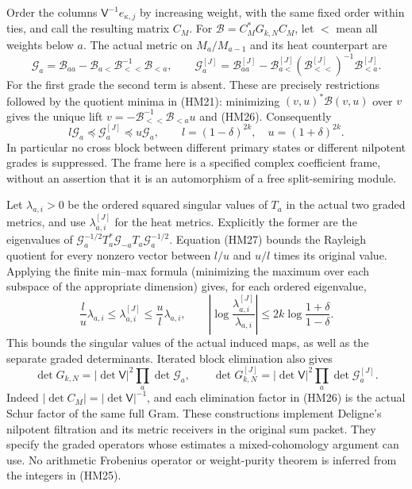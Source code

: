 \documentclass[11pt]{article}
\begin{document}
Order the columns $\mathsf V^{-1}e_{\kappa,j}$ by increasing weight,
with the same fixed order within ties, and call the resulting matrix $C_M$.
For $\mathcal B=C_M^*G_{k,N}C_M$, let $<$ mean all weights below $a$.
The actual metric on $M_a/M_{a-1}$ and its heat counterpart are
\begin{equation}\tag{HM26}
 \mathcal G_a=\mathcal B_{aa}
       -\mathcal B_{a<}\mathcal B_{<<}^{-1}\mathcal B_{<a},\qquad
 \mathcal G_a^{[J]}=\mathcal B_{aa}^{[J]}
       -\mathcal B_{a<}^{[J]}(\mathcal B_{<<}^{[J]})^{-1}
                                      \mathcal B_{<a}^{[J]}.
\end{equation}
For the first grade the second term is absent. These are precisely
restrictions followed by the quotient minima in (HM21): minimizing
$(v,u)^*\mathcal B(v,u)$ over $v$ gives the unique lift
$v=-\mathcal B_{<<}^{-1}\mathcal B_{<a}u$ and (HM26). Consequently
\begin{equation}\tag{HM27}
 l\mathcal G_a\preceq\mathcal G_a^{[J]}\preceq u\mathcal G_a,
 \qquad l=(1-\delta)^{2k},\quad u=(1+\delta)^{2k}.
\end{equation}
In particular no cross block between different primary states or
different nilpotent grades is suppressed. The frame here is a specified
complex coefficient frame, without an assertion that it is an
automorphism of a free split-semiring module.

Let $\lambda_{a,i}>0$ be the ordered squared singular values of $T_a$
in the actual two graded metrics, and use $\lambda_{a,i}^{[J]}$ for
the heat metrics. Explicitly the former are the eigenvalues of
$\mathcal G_a^{-1/2}T_a^*\mathcal G_{-a}T_a\mathcal G_a^{-1/2}$.
Equation (HM27) bounds the Rayleigh quotient for every nonzero vector
between $l/u$ and $u/l$ times its original value. Applying the finite
min--max formula (minimizing the maximum over each subspace of the
appropriate dimension) gives, for each ordered eigenvalue,
\begin{equation}\tag{HM28}
 \frac lu\lambda_{a,i}\le\lambda_{a,i}^{[J]}
        \le\frac ul\lambda_{a,i},\qquad
 \left|\log\frac{\lambda_{a,i}^{[J]}}{\lambda_{a,i}}\right|
 \le2k\log\frac{1+\delta}{1-\delta}.
\end{equation}
This bounds the singular values of the actual induced maps, as well as
the separate graded determinants. Iterated block elimination also gives
\begin{equation}\tag{HM29}
 \det G_{k,N}=|\det\mathsf V|^2\prod_a\det\mathcal G_a,
 \qquad
 \det G_{k,N}^{[J]}=|\det\mathsf V|^2\prod_a\det\mathcal G_a^{[J]}.
\end{equation}
Indeed $|\det C_M|=|\det\mathsf V|^{-1}$, and each elimination factor
in (HM26) is the actual Schur factor of the same full Gram.
These constructions implement Deligne's nilpotent filtration and its
metric receivers in the original sum packet. They specify the graded
operators whose estimates a mixed-cohomology argument can use. No
arithmetic Frobenius operator or weight-purity theorem is inferred from
the integers in (HM25).
\end{document}

